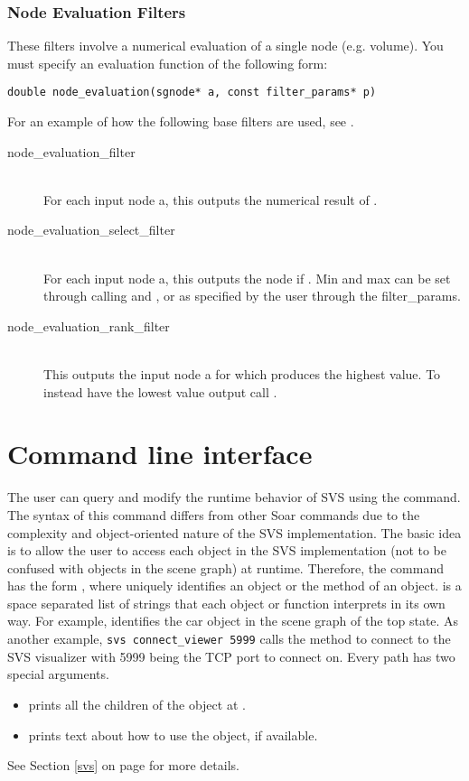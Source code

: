 \subsubsection{Node Evaluation Filters}

These filters involve a numerical evaluation of a single node (e.g. volume).
You must specify an evaluation function of the following form:

\begin{verbatim}
double node_evaluation(sgnode* a, const filter_params* p)
\end{verbatim}

For an example of how the following base filters are used, see .

\begin{description}
	\item[node\_evaluation\_filter] \hfill \\
		For each input node a, this outputs the numerical result of .
	\item[node\_evaluation\_select\_filter] \hfill \\
		For each input node a, this outputs the node if . Min and max can be set through calling  and , or as specified by the user through the filter\_params.
	\item[node\_evaluation\_rank\_filter] \hfill \\
		This outputs the input node a for which  produces the highest value. To instead have the lowest value output call .
\end{description}


\section{Command line interface}

The user can query and modify the runtime behavior of SVS using the  command.
The syntax of this command differs from other Soar commands due to the complexity and object-oriented nature of the SVS implementation.
The basic idea is to allow the user to access each object in the SVS implementation (not to be confused with objects in the scene graph) at runtime.
Therefore, the command has the form , where  uniquely identifies an object or the method of an object.
 is a space separated list of strings that each object or function interprets in its own way.
For example,  identifies the car object
in the scene graph of the top state.
As another example, \verb|svs connect_viewer 5999| calls the method to connect to the SVS visualizer with 5999 being the TCP port to connect on.
Every path has two special arguments.

\begin{itemize}
	\item{} prints all the children of the object at .
	\item{} prints text about how to use the object, if available.
\end{itemize}

See Section \ref{svs} on page \pageref{svs} for more details.
